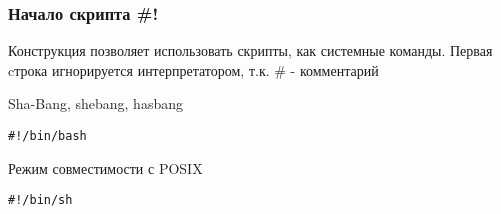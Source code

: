 \begin{frame}[fragile]
	\frametitle{Начало скрипта \#!}

        Конструкция позволяет использовать скрипты, как системные команды. 
        Первая cтрока игнорируется интерпретатором, т.к. \# - комментарий

	\begin{block}{Sha-Bang, shebang, hasbang}
		\begin{lstlisting}
#!/bin/bash
		\end{lstlisting}
	\end{block}

	\begin{block}{Режим совместимости с POSIX}
		\begin{lstlisting}
#!/bin/sh
		\end{lstlisting}

	\end{block}

\end{frame}
